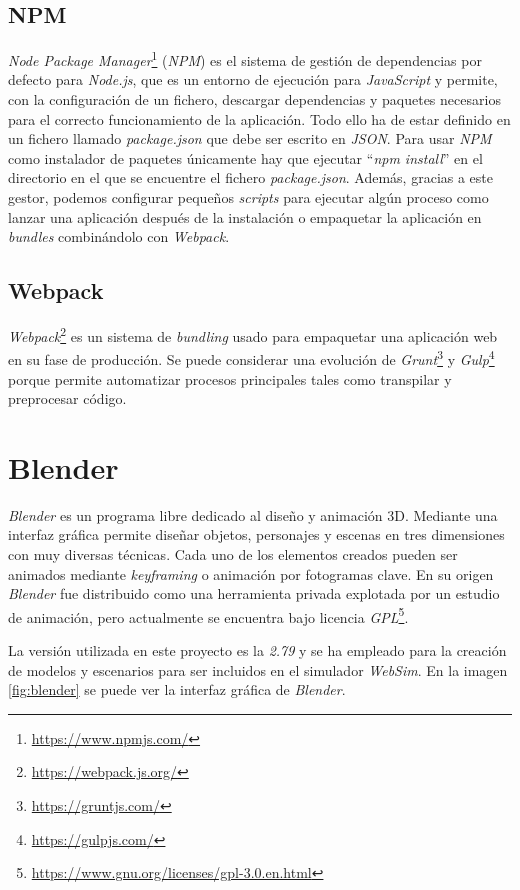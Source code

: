 \subsection{NPM}
\textit{Node Package Manager}\footnote{\url{https://www.npmjs.com/}} (\textit{NPM}) es el sistema de gestión de dependencias por defecto para \textit{Node.js}, que es un entorno de ejecución para \textit{JavaScript} y permite, con la configuración de un fichero, descargar dependencias y paquetes necesarios para el correcto funcionamiento de la aplicación. Todo ello ha de estar definido en un fichero llamado \textit{package.json} que debe ser escrito en \textit{JSON}. Para usar \textit{NPM} como instalador de paquetes únicamente hay que ejecutar ``\textit{npm install}'' en el directorio en el que se encuentre el fichero \textit{package.json}. Además, gracias a este gestor, podemos configurar pequeños \textit{scripts} para ejecutar algún proceso como lanzar una aplicación después de la instalación o empaquetar la aplicación en \textit{bundles} combinándolo con \textit{Webpack}.

\subsection{Webpack}
\textit{Webpack}\footnote{\url{https://webpack.js.org/}} es un sistema de \textit{bundling} usado para empaquetar una aplicación web en su fase de producción. Se puede considerar una evolución de \textit{Grunt}\footnote{\url{https://gruntjs.com/}} y \textit{Gulp}\footnote{\url{https://gulpjs.com/}} porque permite automatizar procesos principales tales como transpilar y preprocesar código. 


\section{Blender}
\label{sec:blender}
\textit{Blender} es un programa libre dedicado al diseño y animación 3D. Mediante una interfaz gráfica permite diseñar objetos, personajes y escenas en tres dimensiones con muy diversas técnicas. Cada uno de los elementos creados pueden ser animados mediante \textit{keyframing} o animación por fotogramas clave. En su origen \textit{Blender} fue distribuido como una herramienta privada explotada por un estudio de animación, pero actualmente se encuentra bajo licencia \textit{GPL}\footnote{\url{https://www.gnu.org/licenses/gpl-3.0.en.html}}. 

La versión utilizada en este proyecto es la \textit{2.79} y se ha empleado para la creación de modelos y escenarios para ser incluidos en el simulador \textit{WebSim}. En la imagen \ref{fig:blender} se puede ver la interfaz gráfica de \textit{Blender}. \\

